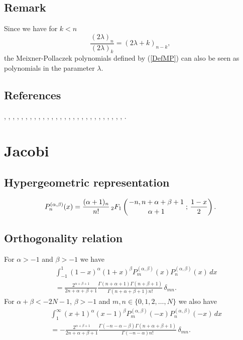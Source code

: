 \documentclass[envcountchap,graybox]{svmono}
\newcommand{\hyp}[5]{\mbox{}_{#1}{F}_{#2}
\left(\genfrac{}{}{0pt}{}{#3}{#4}\,;\,#5\right)}
\renewcommand{\Gamma}{\varGamma}
\begin{document}
\subsection*{Remark}
Since we have for $k<n$
$$\frac{(2\lambda)_n}{(2\lambda)_k}=(2\lambda+k)_{n-k},$$
the Meixner-Pollaczek polynomials defined by (\ref{DefMP}) can also be seen as polynomials
in the parameter $\lambda$.

\subsection*{References}
\cite{AlSalam90}, \cite{AlSalamChihara76}, \cite{AndrewsAskey85}, \cite{Araaya2004},
\cite{Araaya2005}, \cite{Askey89I}, \cite{AskeyWilson85}, \cite{AtakRahmanSuslov},
\cite{AtakSuslov88}, \cite{CharrisIsmail}, \cite{ChenIsmail97}, \cite{Chihara78},
\cite{Ismail85II}, \cite{Ismail94}, \cite{Ismail2005II}, \cite{IsmailLi},
\cite{IsmailStanton97}, \cite{Koekoek2000}, \cite{Koorn88}, \cite{Koorn89II},
\cite{LabelleYehI}, \cite{LabelleYehII}, \cite{Lesky95II}, \cite{LiWong}, \cite{Meixner},
\cite{Nikiforov+}, \cite{Rahman78I}, \cite{Wilson80}, \cite{Wimp90}.


\section{Jacobi}

\par\setcounter{equation}{0}

\subsection*{Hypergeometric representation}
\begin{equation}
\label{DefJacobi}
P_n^{(\alpha,\beta)}(x)=\frac{(\alpha+1)_n}{n!}\,
\hyp{2}{1}{-n,n+\alpha+\beta+1}{\alpha+1}{\frac{1-x}{2}}.
\end{equation}

\subsection*{Orthogonality relation}
For $\alpha>-1$ and $\beta>-1$ we have
\begin{eqnarray}
\label{OrtJacobi1}
& &\int_{-1}^1(1-x)^{\alpha}(1+x)^{\beta}P_m^{(\alpha,\beta)}(x)P_n^{(\alpha,\beta)}(x)\,dx\nonumber\\
& &{}=\frac{2^{\alpha+\beta+1}}{2n+\alpha+\beta+1}\frac{\Gamma(n+\alpha+1)\Gamma(n+\beta+1)}{\Gamma(n+\alpha+\beta+1)n!}\,\delta_{mn}.
\end{eqnarray}
For $\alpha+\beta<-2N-1$, $\beta>-1$ and $m,n\in\{0,1,2,\ldots,N\}$ we also have
\begin{eqnarray}
\label{OrtJacobi2}
& &\int_1^{\infty}(x+1)^{\alpha}(x-1)^{\beta}P_m^{(\alpha,\beta)}(-x)P_n^{(\alpha,\beta)}(-x)\,dx\nonumber\\
& &{}=-\frac{2^{\alpha+\beta+1}}{2n+\alpha+\beta+1}\frac{\Gamma(-n-\alpha-\beta)\Gamma(n+\alpha+\beta+1)}{\Gamma(-n-\alpha)n!}\,\delta_{mn}.
\end{eqnarray}
\end{document}
